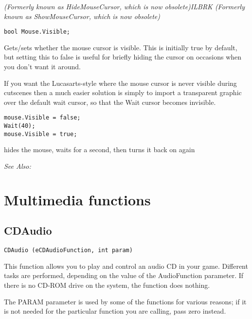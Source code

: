 \it{(Formerly known as HideMouseCursor, which is now obsolete)}ILBRK
\it{(Formerly known as ShowMouseCursor, which is now obsolete)}

\begin{verbatim}
bool Mouse.Visible;
\end{verbatim}
Gets/sets whether the mouse cursor is visible. This is initially true by default,
but setting this to false is useful for briefly hiding the cursor on occasions
when you don't want it around.

If you want the Lucasarts-style where the mouse cursor is never visible during cutscenes
then a much easier solution is simply to import a transparent graphic over the default
wait cursor, so that the Wait cursor becomes invisible.

\begin{verbatim}
mouse.Visible = false;
Wait(40);
mouse.Visible = true;
\end{verbatim}
hides the mouse, waits for a second, then turns it back on again

\it{See Also:} 


\section{Multimedia functions}%

\subsection{CDAudio}\label{CDAudio}%

\begin{verbatim}
CDAudio (eCDAudioFunction, int param)
\end{verbatim}
This function allows you to play and control an audio CD in your game.
Different tasks are performed, depending on the value of the AudioFunction
parameter. If there is no CD-ROM drive on the system, the function does
nothing.

The PARAM parameter is used by some of the functions for various reasons; if
it is not needed for the particular function you are calling, pass zero
instead.

